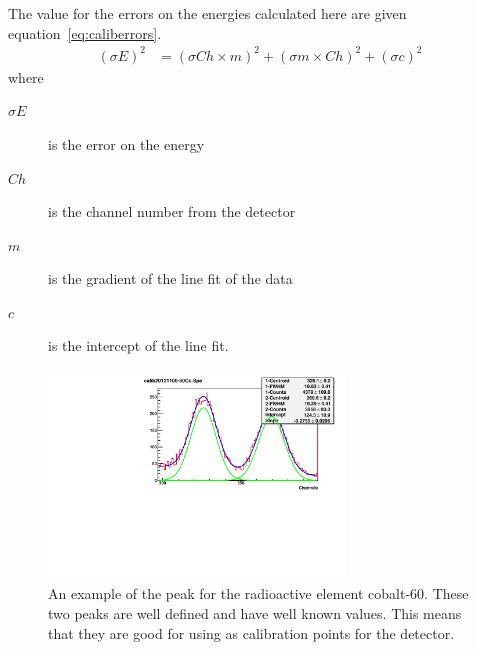The value for the errors on the energies calculated here are given equation~\ref{eq:caliberrors}.
\begin{align}
	\left(\sigma E\right)^2 &= \left(\sigma Ch\times m\right)^2 + \left(\sigma m\times Ch\right)^2 + \left(\sigma c\right)^2 \label{eq:caliberrors}	
\end{align}
where
\begin{description}
	\item[$\sigma E$] is the error on the energy
	\item[$Ch$] is the channel number from the detector
	\item[$m$] is the gradient of the line fit of the data
	\item[$c$] is the intercept of the line fit.
\end{description}

\begin{figure}[ht]
	\centering
	\includegraphics[width=0.7\textwidth]{calib20121113-60Co.pdf}
	\caption{An example of the peak for the radioactive element cobalt-60. These two peaks are well defined and have well known values. This means that they are good for using as calibration points for the detector.\label{fig:tankspecbuffit}}
\end{figure}


